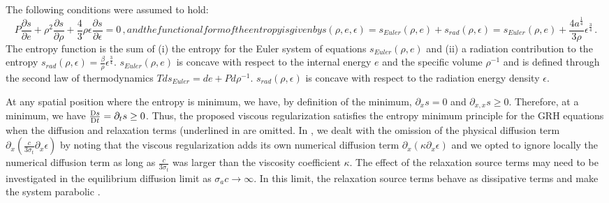 \documentclass{mc2015}
\begin{document}
%
The following conditions were assumed to hold:
\begin{subequations}
\label{eq:visc_reg_assumptions}
\begin{equation} \label{eq:visc_reg_assumptions1}
P \frac{\partial s}{\partial e} + \rho^2 \frac{\partial s}{\partial \rho} + \frac{4}{3} \rho \epsilon \frac{\partial s}{\partial \epsilon} = 0 \,,
\end{equation}
%
and the functional form of the entropy is given by
%
\begin{equation}\label{eq:ent_equ}
s( \rho, e, \epsilon) = s_{Euler}(\rho, e) + s_{rad}(\rho, \epsilon) = s_{Euler}(\rho, e)+ \frac{4a^{\tfrac{1}{4}}}{3\rho} \epsilon^{\tfrac{3}{4}} \,.
\end{equation}
\end{subequations}
%
The entropy function is the sum of (i) the entropy for the Euler system of equations $s_{Euler}(\rho, e)$ and (ii) a radiation contribution to the entropy $s_{rad}(\rho,\epsilon)=\tfrac{\beta}{\rho} \epsilon^\frac{3}{4}$. 
$s_{Euler}(\rho, e)$ is concave with respect to the internal energy $e$ and the specific volume $\rho^{-1}$ and is defined through the second law of thermodynamics $Tds_{Euler} = de + P d \rho^{-1}$. $s_{rad}(\rho,\epsilon)$ is concave with respect to the radiation energy density $\epsilon$. 
%

At any spatial position where the entropy is minimum, we have, by definition of the minimum, $\partial_x s =0$ and $\partial_{x,x} s \geq 0$. Therefore, at a minimum, we have $\frac{\textrm{D} s}{\textrm{D} t}=\partial_t s \geq 0$. Thus, the proposed viscous regularization satisfies the entropy minimum principle for the GRH equations when the diffusion and relaxation terms (underlined in  are omitted. In \cite{our_jcp_radhy_paper}, we dealt with the omission of the physical diffusion term $\partial_x( \tfrac{c}{3 \sigma_t} \partial_x \epsilon)$ by noting that the viscous regularization adds its own numerical diffusion term $\partial_x \left( \kappa \partial_x \epsilon \right)$ and we opted to ignore
locally the numerical diffusion term as long as $\frac{c}{3 \sigma_t}$ was larger than the viscosity coefficient $\kappa$. 
%
The effect of the relaxation source terms may need to be investigated in the equilibrium diffusion limit as $\sigma_a c \to \infty$. In this limit, the relaxation source terms behave as dissipative terms and make the system parabolic \cite{Leveque}. 



\end{document}
